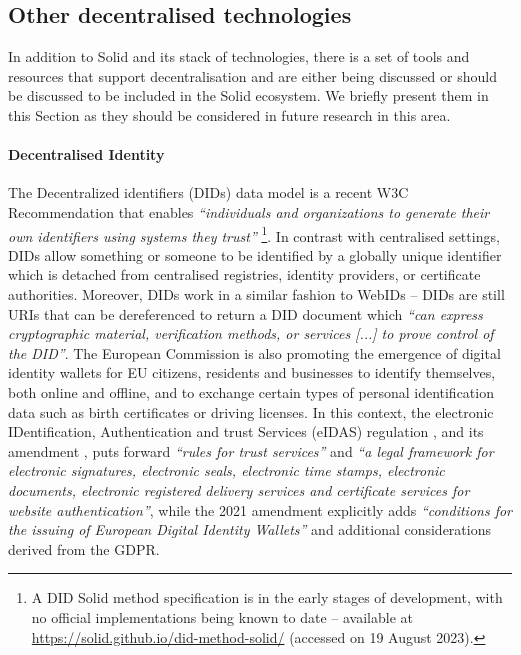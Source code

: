 
\subsection{Other decentralised technologies}
\label{sec:sota_other_technologies}

In addition to Solid and its stack of technologies, there is a set of tools and resources that support decentralisation and are either being discussed or should be discussed to be included in the Solid ecosystem.
We briefly present them in this Section as they should be considered in future research in this area.

\paragraph{Decentralised Identity}
The Decentralized identifiers (DIDs) data model is a recent W3C Recommendation that enables \textit{``individuals and organizations to generate their own identifiers using systems they trust''} \citep{sporny_decentralized_2022}\footnote{A DID Solid method specification is in the early stages of development, with no official implementations being known to date -- available at \url{https://solid.github.io/did-method-solid/} (accessed on 19 August 2023).}.
In contrast with centralised settings, DIDs allow something or someone to be identified by a globally unique identifier which is detached from centralised registries, identity providers, or certificate authorities.
Moreover, DIDs work in a similar fashion to WebIDs -- DIDs are still URIs that can be dereferenced to return a DID document which \textit{``can express cryptographic material, verification methods, or services [...] to prove control of the DID''}.
The European Commission is also promoting the emergence of digital identity wallets for EU citizens, residents and businesses to identify themselves, both online and offline, and to exchange certain types of personal identification data such as birth certificates or driving licenses.
In this context, the electronic IDentification, Authentication and trust Services (eIDAS) regulation \citeyearpar{noauthor_regulation_2014}, and its amendment \citeyearpar{noauthor_eidas2_2021}, puts forward \textit{``rules for trust services''} and \textit{``a legal framework for electronic signatures, electronic seals, electronic time stamps, electronic documents, electronic registered delivery services and certificate services for website authentication''}, while the 2021 amendment explicitly adds \textit{``conditions for the issuing of European Digital Identity Wallets''} and additional considerations derived from the GDPR.


